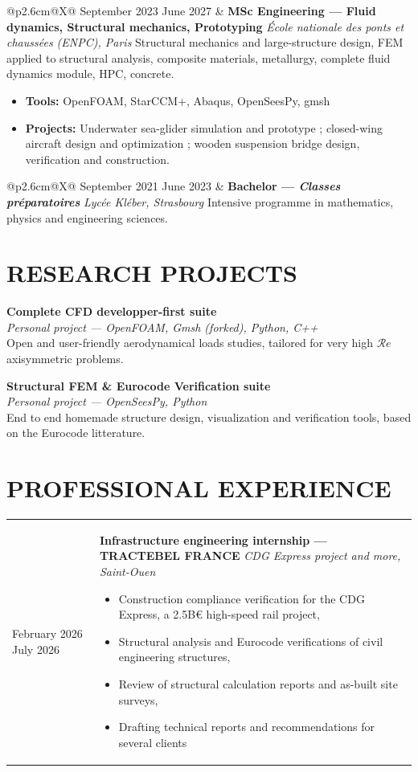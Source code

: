 \documentclass[a4paper,9pt]{extarticle}
\makeatletter
\newcommand{\entry}[4]{%
  \noindent
  \begin{tabularx}{\linewidth}{@{}p{2.6cm}@{\hspace{6pt}}X@{}}
    \small\textcolor{muted}{#1} &
    \textbf{#2} \newline
    \textit{\small\textcolor{muted}{#3}}
    #4
  \end{tabularx}
  \vspace{1pt}
}
\newcommand{\wideentry}[3]{%
  \noindent\textbf{#1}\\
  \textit{\small\textcolor{muted}{#2}}\\
  \small #3\par
  \vspace{1pt}
}
\makeatother
\begin{document}
\entry{September 2023 \newline June 2027}
  {MSc Engineering — Fluid dynamics, Structural mechanics, Prototyping}
  {École nationale des ponts et chaussées (ENPC), Paris}
  {\newline Structural mechanics and large-structure design, FEM applied to structural analysis, composite materials, metallurgy, complete fluid dynamics module, HPC, concrete.
  \begin{itemize}
    \item \textbf{Tools:} OpenFOAM, StarCCM+, Abaqus, OpenSeesPy, gmsh
    \item \textbf{Projects:} Underwater sea-glider simulation and prototype ; closed-wing aircraft design and optimization ; wooden suspension bridge design, verification and construction.
  \end{itemize}}

\entry{September 2021 \newline June 2023}
  {Bachelor — \textit{Classes préparatoires}}
  {Lycée Kléber, Strasbourg}
  {\newline Intensive programme in mathematics, physics and engineering sciences.
  }

\section{RESEARCH PROJECTS}

\wideentry
  {Complete CFD developper-first suite}
  {Personal project — OpenFOAM, Gmsh (forked), Python, C++}
  {Open and user-friendly aerodynamical loads studies, tailored for very high $\mathcal{R}e$ axisymmetric problems.}

\wideentry
  {Structural FEM \& Eurocode Verification suite}
  {Personal project — OpenSeesPy, Python}
  {End to end homemade structure design, visualization and verification tools, based on the Eurocode litterature.}

\section{PROFESSIONAL EXPERIENCE}

\entry{February 2026 \newline July 2026}
  {Infrastructure engineering internship — TRACTEBEL FRANCE}
  {CDG Express project and more, Saint-Ouen}
  {\begin{itemize}
    \item Construction compliance verification for the CDG Express, a 2.5B€ high-speed rail project,
    \item Structural analysis and Eurocode verifications of civil engineering structures,
    \item Review of structural calculation reports and as-built site surveys,
    \item Drafting technical reports and recommendations for several clients
  \end{itemize}}
\end{document}
